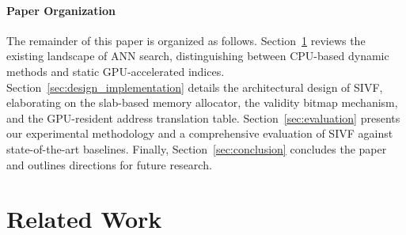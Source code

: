 \documentclass[sigconf,anonymous]{acmart}
\theoremstyle{plain}
\theoremstyle{definition}
\theoremstyle{remark}
\begin{document}
\paragraph{Paper Organization}
The remainder of this paper is organized as follows. 
Section~\ref{sec:related_work} reviews the existing landscape of ANN search, distinguishing between CPU-based dynamic methods and static GPU-accelerated indices. 
Section~\ref{sec:design_implementation} details the architectural design of SIVF, elaborating on the slab-based memory allocator, the validity bitmap mechanism, and the GPU-resident address translation table. 
Section~\ref{sec:evaluation} presents our experimental methodology and a comprehensive evaluation of SIVF against state-of-the-art baselines. 
Finally, Section~\ref{sec:conclusion} concludes the paper and outlines directions for future research.

\section{Related Work}
\label{sec:related_work}

\end{document}
